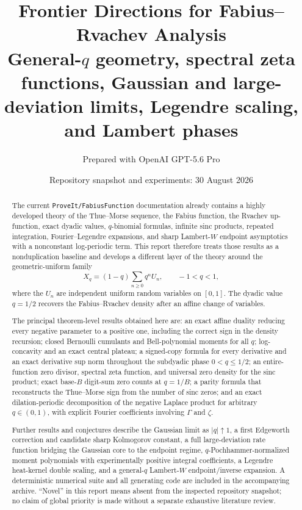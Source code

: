 \documentclass[11pt]{article}
\title{\bfseries Frontier Directions for Fabius--Rvachev Analysis\\[0.45em]
\large General-$q$ geometry, spectral zeta functions, Gaussian and large-deviation limits, Legendre scaling, and Lambert phases}
\author{Prepared with OpenAI GPT-5.6 Pro}
\date{Repository snapshot and experiments: 30 August 2026}
\theoremstyle{definition}
\theoremstyle{remark}
\newcommand{\repo}{\texttt{ProveIt/FabiusFunction}}
\begin{document}
\maketitle

\begin{abstract}
The current \repo{} documentation already contains a highly developed theory of the Thue--Morse sequence, the Fabius function, the Rvachev up-function, exact dyadic values, $q$-binomial formulas, infinite sinc products, repeated integration, Fourier--Legendre expansions, and sharp Lambert-$W$ endpoint asymptotics with a nonconstant log-periodic term.  This report therefore treats those results as a nonduplication baseline and develops a different layer of the theory around the geometric-uniform family
\[
 X_q=(1-q)\sum_{n\ge 0}q^nU_n,\qquad -1<q<1,
\]
where the $U_n$ are independent uniform random variables on $[0,1]$.  The dyadic value $q=1/2$ recovers the Fabius--Rvachev density after an affine change of variables.

The principal theorem-level results obtained here are: an exact affine duality reducing every negative parameter to a positive one, including the correct sign in the density recursion; closed Bernoulli cumulants and Bell-polynomial moments for all $q$; log-concavity and an exact central plateau; a signed-copy formula for every derivative and an exact derivative sup norm throughout the subdyadic phase $0<q\le 1/2$; an entire-function zero divisor, spectral zeta function, and universal zero density for the sinc product; exact base-$B$ digit-sum zero counts at $q=1/B$; a parity formula that reconstructs the Thue--Morse sign from the number of sinc zeros; and an exact dilation-periodic decomposition of the negative Laplace product for arbitrary $q\in(0,1)$, with explicit Fourier coefficients involving $\Gamma$ and $\zeta$.

Further results and conjectures describe the Gaussian limit as $|q|\uparrow1$, a first Edgeworth correction and candidate sharp Kolmogorov constant, a full large-deviation rate function bridging the Gaussian core to the endpoint regime, $q$-Pochhammer-normalized moment polynomials with experimentally positive integral coefficients, a Legendre heat-kernel double scaling, and a general-$q$ Lambert-$W$ endpoint/inverse expansion.  A deterministic numerical suite and all generating code are included in the accompanying archive.  ``Novel'' in this report means absent from the inspected repository snapshot; no claim of global priority is made without a separate exhaustive literature review.
\end{abstract}
\end{document}
